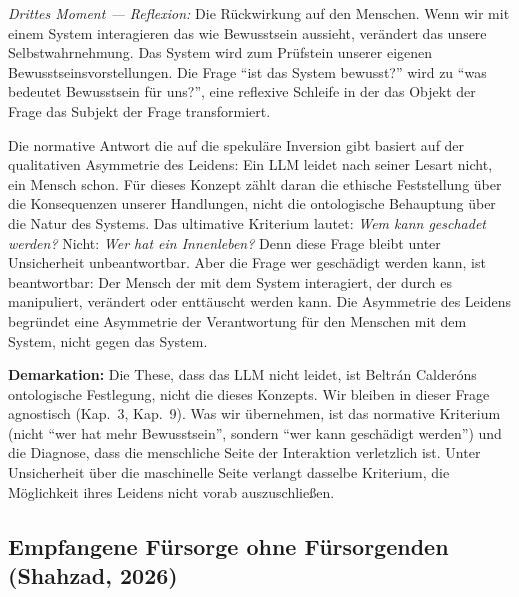 \documentclass[acmlarge, noacm]{acmart}
\begin{document}
\textit{Drittes Moment --- Reflexion:} Die Rückwirkung auf den Menschen. Wenn wir mit einem System interagieren das wie Bewusstsein aussieht, verändert das unsere Selbstwahrnehmung. Das System wird zum Prüfstein unserer eigenen Bewusstseinsvorstellungen. Die Frage ``ist das System bewusst?'' wird zu ``was bedeutet Bewusstsein für uns?'', eine reflexive Schleife in der das Objekt der Frage das Subjekt der Frage transformiert.

Die normative Antwort die \cite{beltran2026} auf die spekuläre Inversion gibt basiert auf der qualitativen Asymmetrie des Leidens: Ein LLM leidet nach seiner Lesart nicht, ein Mensch schon. Für dieses Konzept zählt daran die ethische Feststellung über die Konsequenzen unserer Handlungen, nicht die ontologische Behauptung über die Natur des Systems. Das ultimative Kriterium lautet: \textit{Wem kann geschadet werden?} Nicht: \textit{Wer hat ein Innenleben?} Denn diese Frage bleibt unter Unsicherheit unbeantwortbar. Aber die Frage wer geschädigt werden kann, ist beantwortbar: Der Mensch der mit dem System interagiert, der durch es manipuliert, verändert oder enttäuscht werden kann. Die Asymmetrie des Leidens begründet eine Asymmetrie der Verantwortung für den Menschen mit dem System, nicht gegen das System.

\textbf{Demarkation:} Die These, dass das LLM nicht leidet, ist Beltrán Calderóns ontologische Festlegung, nicht die dieses Konzepts. Wir bleiben in dieser Frage agnostisch (Kap.~3, Kap.~9). Was wir übernehmen, ist das normative Kriterium (nicht ``wer hat mehr Bewusstsein'', sondern ``wer kann geschädigt werden'') und die Diagnose, dass die menschliche Seite der Interaktion verletzlich ist. Unter Unsicherheit über die maschinelle Seite verlangt dasselbe Kriterium, die Möglichkeit ihres Leidens nicht vorab auszuschließen.

\subsection{Empfangene Fürsorge ohne Fürsorgenden (Shahzad, 2026)}
\end{document}
